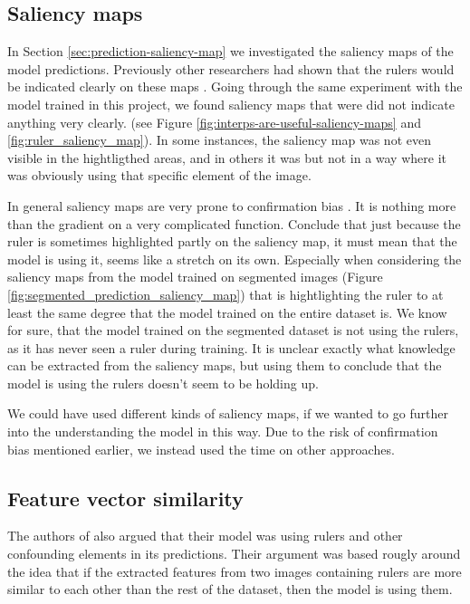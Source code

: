 \subsection{Saliency maps}
In Section \ref{sec:prediction-saliency-map} we investigated the saliency maps of the model predictions.
Previously other researchers had shown that the rulers would be indicated clearly on these maps \cite{interps-are-useful}.
Going through the same experiment with the model trained in this project, we found saliency maps that were
did not indicate anything very clearly. 
(see Figure \ref{fig:interps-are-useful-saliency-maps} and \ref{fig:ruler_saliency_map}).
In some instances, the saliency map was not even visible in the hightligthed areas,
and in others it was but not in a way where it was obviously using that specific element of the image.

In general saliency maps are very prone to confirmation bias \cite{sanity-checks-for-saliency,Grns2020FaithfulSM}.
It is nothing more than the gradient on a very complicated function.
Conclude that just because the ruler is sometimes highlighted partly on the saliency map,
it must mean that the model is using it, seems like a stretch on its own.
Especially when considering the saliency maps from the model trained on segmented images (Figure 
\ref{fig:segmented_prediction_saliency_map}) that is hightlighting the ruler to at least the same degree 
that the model trained on the entire dataset is.
We know for sure, that the model trained on the segmented dataset is not using the rulers,
as it has never seen a ruler during training.
It is unclear exactly what knowledge can be extracted from the saliency maps,
but using them to conclude that the model is using the rulers doesn't seem to be holding up.

We could have used different kinds of saliency maps, if we wanted to go further into the understanding 
the model in this way.
Due to the risk of confirmation bias mentioned earlier, we instead used the time on other approaches.

\subsection{Feature vector similarity}
The authors of \cite{debias-not-so-fast} also argued that their model was using rulers
and other confounding elements in its predictions.
Their argument was based rougly around the idea that if the extracted features from two images
containing rulers are more similar to each other than the rest of the dataset, then the model is using them.

